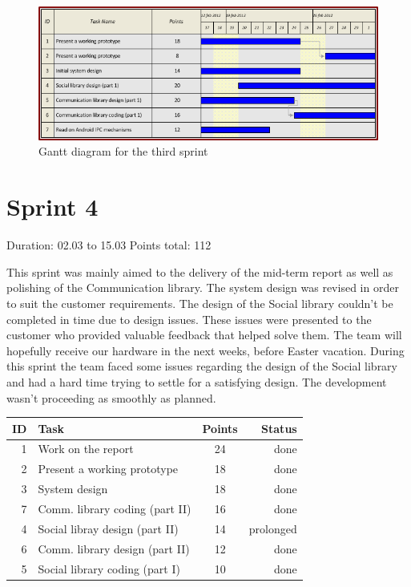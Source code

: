\begin{figure}[h!]
\centering \includegraphics[scale=0.8]{img/sprints-gantt3.png}
\caption{Gantt diagram for the third sprint}
\label{fig:sprints-gantt3}
\end{figure}

\newpage


\section{Sprint 4}

Duration: 02.03 to 15.03
Points total: 112

This sprint was mainly aimed to the delivery of the mid-term report as well
as polishing of the Communication library. The system design was revised in
order to suit the customer requirements. The design of the Social library couldn't
be completed in time due to design issues. These issues were presented to the
customer who provided valuable feedback that helped solve them. The team will hopefully
receive our hardware in the next weeks, before Easter vacation. During this sprint the team
faced some issues regarding the design of the Social library and had a hard time trying
to settle for a satisfying design. The development wasn't proceeding as smoothly as planned.

\begin{table}[ht!]
\begin{tabular}{ | r | l | c | r | }

\hline
\textbf{ID} & \textbf{Task} & \textbf{Points} & \textbf{Status} \\
\hline

 1 & Work on the report				& 24 & done \\
\hline
 2 & Present a working prototype	& 18 & done \\
\hline
 3 & System design					& 18 & done \\
\hline
 7 & Comm. library coding (part II)	& 16 & done \\
\hline
 4 & Social libray design (part II)	& 14 & prolonged \\
\hline
 6 & Comm. library design (part II)	& 12 & done \\
\hline
 5 & Social library coding (part I)	& 10 & done \\
\hline

\end{tabular}
\end{table}

